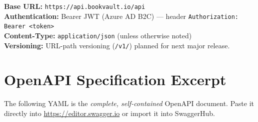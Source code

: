 \documentclass[12pt, a4paper]{report}
\begin{document}
\begin{infobox}
  \textbf{Base URL:} \texttt{https://api.bookvault.io/api}\\
  \textbf{Authentication:} Bearer JWT (Azure AD B2C) — header \texttt{Authorization: Bearer <token>}\\
  \textbf{Content-Type:} \texttt{application/json} (unless otherwise noted)\\
  \textbf{Versioning:} URL-path versioning (\texttt{/v1/}) planned for next major release.
\end{infobox}

\section{OpenAPI Specification Excerpt}

The following YAML is the \textit{complete, self-contained} OpenAPI document.
Paste it directly into \url{https://editor.swagger.io} or import it into SwaggerHub.
\end{document}
